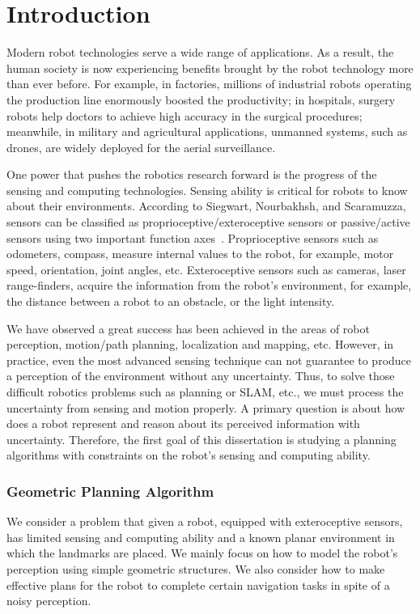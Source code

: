 \chapter{Introduction} 
\label{chp:intro}

Modern robot technologies serve a wide range of applications. 
%
As a result, the human society is now experiencing benefits brought by the robot technology more than ever before.
%
For example, in factories, millions of industrial robots operating the production line enormously boosted the productivity; 
in hospitals, surgery robots help doctors to achieve high accuracy in the surgical procedures; 
meanwhile, in military and agricultural applications, unmanned systems, such as drones, are widely deployed for the aerial surveillance.


%
One power that pushes the robotics research forward is the progress of the sensing and computing technologies. 
%
Sensing ability is critical for robots to know about their environments. 
According to Siegwart, Nourbakhsh, and Scaramuzza, sensors can be classified as proprioceptive/exteroceptive sensors or passive/active sensors using two important function axes~\cite{SieNouSca11}.
%
Proprioceptive sensors such as odometers,
compass, measure internal values to the robot, for example, motor speed, orientation, joint angles, etc.
%
Exteroceptive sensors such as cameras, laser range-finders, acquire the information from the robot's environment, for example, the distance between a robot to an obstacle, or the light intensity. 

%
We have observed a great success has been achieved in the areas of robot perception, motion/path planning, localization and mapping, etc. 
%
However, in practice, even the most advanced sensing technique can not guarantee to produce a perception of the
environment without any uncertainty.  
%
Thus, to solve those difficult robotics problems such as planning or SLAM, etc., we must process the uncertainty from sensing and motion properly.
%
A primary question is about how does a robot represent and reason about its perceived information with uncertainty.
%
Therefore, the first goal of this dissertation is studying a planning algorithms with constraints on the robot's sensing and computing ability.

\subsection{Geometric Planning Algorithm}
We consider a problem that given a robot, equipped with exteroceptive sensors,
has limited sensing and computing
ability and a known planar environment in which the landmarks are
placed. 
We mainly focus on how to model the robot's perception using simple
geometric structures.
We also consider how to make effective plans for the robot to complete certain navigation tasks 
in spite of a noisy perception.

